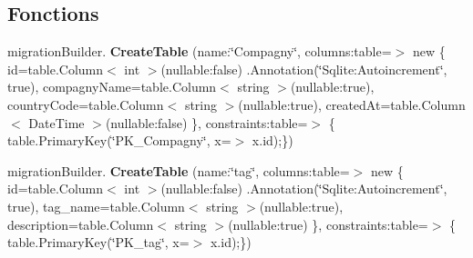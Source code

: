 \subsection*{Fonctions}
\begin{DoxyCompactItemize}
\item 
\mbox{\label{namespace_mediwatch_1_1_server_1_1_migrations_1_1_db_context_mediwatch_migrations_a4648f444290ca0439994fce1cdb1f144}} 
migration\+Builder. {\bfseries Create\+Table} (name\+:\char`\"{}Compagny\char`\"{}, columns\+:table=$>$ new \{ id=table.\+Column$<$ int $>$(nullable\+:false) .Annotation(\char`\"{}Sqlite\+:\+Autoincrement\char`\"{}, true), compagny\+Name=table.\+Column$<$ string $>$(nullable\+:true), country\+Code=table.\+Column$<$ string $>$(nullable\+:true), created\+At=table.\+Column$<$ Date\+Time $>$(nullable\+:false) \}, constraints\+:table=$>$ \{ table.\+Primary\+Key(\char`\"{}P\+K\+\_\+\+Compagny\char`\"{}, x=$>$ x.\+id);\})
\item 
\mbox{\label{namespace_mediwatch_1_1_server_1_1_migrations_1_1_db_context_mediwatch_migrations_a4c3b62432574827d811a50fd1a65b0d6}} 
migration\+Builder. {\bfseries Create\+Table} (name\+:\char`\"{}tag\char`\"{}, columns\+:table=$>$ new \{ id=table.\+Column$<$ int $>$(nullable\+:false) .Annotation(\char`\"{}Sqlite\+:\+Autoincrement\char`\"{}, true), tag\+\_\+name=table.\+Column$<$ string $>$(nullable\+:true), description=table.\+Column$<$ string $>$(nullable\+:true) \}, constraints\+:table=$>$ \{ table.\+Primary\+Key(\char`\"{}P\+K\+\_\+tag\char`\"{}, x=$>$ x.\+id);\})
\item 
\mbox{\label{namespace_mediwatch_1_1_server_1_1_migrations_1_1_db_context_mediwatch_migrations_aa72f111d0e3b12f8b5d6db3a89c2dc14}} 

\end{DoxyCompactItemize}
